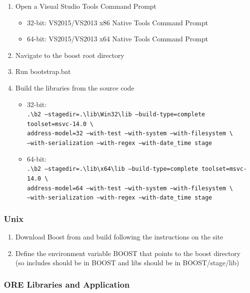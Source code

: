 \documentclass[12pt, a4paper]{article}
\newcommand{\bs}{\textbackslash}
\begin{document}
\begin{enumerate}
\item Open a Visual Studio Tools Command Prompt
\begin{itemize}
\item 32-bit: VS2015/VS2013 x86 Native Tools Command Prompt
\item 64-bit: VS2015/VS2013 x64 Native Tools Command Prompt
\end{itemize}
\item Navigate to the boost root directory
\item Run bootstrap.bat
\item Build the libraries from the source code
\begin{itemize}
\item 32-bit: \\
  {\footnotesize\tt .{\bs}b2 --stagedir=.{\bs}lib{\bs}Win32{\bs}lib --build-type=complete toolset=msvc-14.0 \bs \\
    address-model=32 --with-test --with-system --with-filesystem  \bs \\
    --with-serialization --with-regex --with-date\_time stage}
\item 64-bit: \\
  {\footnotesize\tt .{\bs}b2 --stagedir=.{\bs}lib{\bs}x64{\bs}lib --build-type=complete toolset=msvc-14.0 \bs \\
    address-model=64 --with-test --with-system --with-filesystem \bs \\
    --with-serialization --with-regex --with-date\_time stage}
\end{itemize}
\end{enumerate}

\subsubsection*{Unix}

\begin{enumerate}
\item Download Boost from \cite{boost} and build following the instructions on the site
\item Define the environment variable BOOST that points to the boost directory
(so includes should be in BOOST and libs should be in BOOST/stage/lib)
\end{enumerate}

\subsubsection{ORE Libraries and Application}\label{sec:build}
\end{document}
